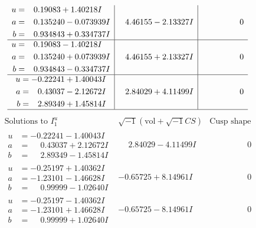 \documentclass[1p]{elsarticle_modified}
\theoremstyle{definition}
\newcommand{\I}{\sqrt{-1}}
\begin{document}
$$\begin{array}{c|c|c}
\begin{aligned}
u &= \phantom{-}0.19083 + 1.40218 I \\
a &= \phantom{-}0.135240 - 0.073939 I \\
b &= \phantom{-}0.934843 + 0.334737 I\end{aligned}
 & \phantom{-}4.46155 - 2.13327 I & \phantom{-0.000000 } 0 \\ \hline\begin{aligned}
u &= \phantom{-}0.19083 - 1.40218 I \\
a &= \phantom{-}0.135240 + 0.073939 I \\
b &= \phantom{-}0.934843 - 0.334737 I\end{aligned}
 & \phantom{-}4.46155 + 2.13327 I & \phantom{-0.000000 } 0 \\ \hline\begin{aligned}
u &= -0.22241 + 1.40043 I \\
a &= \phantom{-}0.43037 - 2.12672 I \\
b &= \phantom{-}2.89349 + 1.45814 I\end{aligned}
 & \phantom{-}2.84029 + 4.11499 I & \phantom{-0.000000 } 0\\
 \hline 
 \end{array}$$\newpage$$\begin{array}{c|c|c}  
\text{Solutions to }I^u_{1}& \I (\text{vol} + \sqrt{-1}CS) & \text{Cusp shape}\\
 \hline 
\begin{aligned}
u &= -0.22241 - 1.40043 I \\
a &= \phantom{-}0.43037 + 2.12672 I \\
b &= \phantom{-}2.89349 - 1.45814 I\end{aligned}
 & \phantom{-}2.84029 - 4.11499 I & \phantom{-0.000000 } 0 \\ \hline\begin{aligned}
u &= -0.25197 + 1.40362 I \\
a &= -1.23101 - 1.46628 I \\
b &= \phantom{-}0.99999 - 1.02640 I\end{aligned}
 & -0.65725 + 8.14961 I & \phantom{-0.000000 } 0 \\ \hline\begin{aligned}
u &= -0.25197 - 1.40362 I \\
a &= -1.23101 + 1.46628 I \\
b &= \phantom{-}0.99999 + 1.02640 I\end{aligned}
 & -0.65725 - 8.14961 I & \phantom{-0.000000 } 0 \\ \hline\begin{aligned}

\end{aligned}
\end{array}$$
\end{document}
